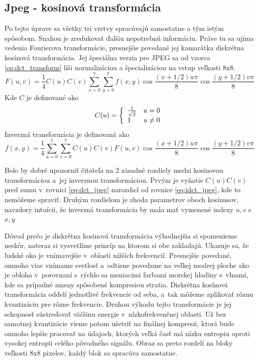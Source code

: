 \subsection{Jpeg - kosínová transformácia}

Po tejto úprave sa všetky tri vrstvy spracúvajú samostatne a tým
istým spôsobom. Snahou je zredukovať ďalšiu nepotrebnú informáciu.
Práve tu sa ujíma vedenia Fourierova transformácie, presnejšie
povedané jej kamarátka diskrétna kosínová transformácia. Jej špeciálna
verzia pre JPEG sa od vzorca \ref{eq:dct_transform} 
líši normalizáciou a špecializáciou na vstup veľkosti 8x8.
\begin{equation}
   F(u,v) = \frac{1}{4} C(u) C(v) 
    \sum_{x=0}^7 \sum_{y=0}^7 f(x,y)
        \cos\frac{(x+1/2) u \pi}{8}
        \cos\frac{(y+1/2) v \pi}{8}
    \label{eq:dct_jpeg}
\end{equation}
Kde $C$ je definované ako
\begin{equation*}
    C(u) = \left\{
        \begin{array}{l l}
            \frac{1}{\sqrt{2}} & u=0 \\
            1 & u\not=0
        \end{array}
        \right.
\end{equation*}
Inverzná transformácia je definovaná ako
\begin{equation}
    f(x,y) = \frac{1}{4} 
        \sum_{u=0}^7 \sum_{v=0}^7 C(u) C(v) F(u,v)
        \cos\frac{(x+1/2) u \pi}{8}
        \cos\frac{(y+1/2) v \pi}{8}
    \label{eq:idct_jpeg}
\end{equation}
\begin{poznamka}
    Bolo by dobré upozorniť čitateľa na 2 zásadné rozdiely medzi
    kosínovou transformáciou a~jej inverznou transformáciou. Prvým je
    vyňatie $C(u) C(v)$ pred sumu v~rovnici \eqref{eq:dct_jpeg}
    narozdiel od rovnice \eqref{eq:idct_jpeg}, kde to nemôžeme spraviť.
    Druhým rozdielom je zhoda parametrov
    oboch kosínusov, navzdory intuícii, že inverzná transformácia by
    mala mať vymenené indexy $u,v$ s $x,y$
\end{poznamka}
Dôvod prečo je
diskrétna kosínová transformácia výhodnejšia si spomenieme neskôr,
nateraz si vysvetlíme princíp na ktorom si obe zakladajú. Ukazuje sa, že
ľudské oko je vnímavejšie v~oblasti nižších frekvencií. Presnejšie
povedané, omnoho viac vnímame svetlosť a~odtiene povedzme na veľkej
modrej ploche ako je obloha v~porovnaní s~rýchlo sa meniacimi farbami
morskej hladiny s~vlnami, kde sa prípadné zmeny spôsobené kompresiou
stratia. Diskrétna kosínová transformácia oddelí
jednotlivé frekvencie od seba, a~tak môžeme aplikovať rôznu
kvantizáciu pre rôzne frekvencie. Druhou výhodu tejto transformácie je
jej schopnosť sústreďovať väčšinu energie v~nízkofrekvenčnej oblasti.
Už bez samotnej kvantizácie vieme potom ušetriť na finálnej kompresii,
ktorá bude omnoho lepšie pracovať na údajoch, ktorých veľká časť má
nízku entropiu oproti vysokej entropii celého pôvodného signálu.
Obraz sa preto rozdelí na bloky veľkosti 8x8 pixelov, každý blok sa
spracúva samostatne.

